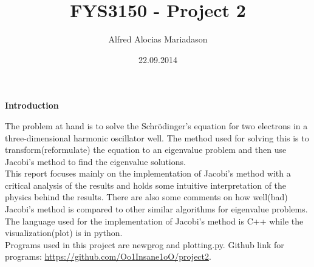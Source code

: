\documentclass[11pt, a4 paper]{report}
\title{FYS3150 - Project 2}
\author{Alfred Alocias Mariadason}
\date{22.09.2014}
\newenvironment{tabbed}{\begin{addmargin}{0.1cm}}{\end{addmargin}}
\newcommand{\sectiontitle}[1]{\begin{center} \Large\textbf{{#1}} \end{center}}
\newcommand{\vsp}{\vspace{0.2cm}}
\begin{document}
\maketitle

\sectiontitle{Introduction}
    \begin{tabbed}
        The problem at hand is to solve the Schrödinger’s equation for two electrons in a three-dimensional harmonic oscillator well. The method used for solving this is to transform(reformulate) the equation to an eigenvalue problem and then use Jacobi's method to find the eigenvalue solutions.\vsp\\
        This report focuses mainly on the implementation of Jacobi's method with a critical analysis of the results and holds some intuitive interpretation of the physics behind the results. There are also some comments on how well(bad) Jacobi's method is compared to other similar algorithms for eigenvalue problems.\vsp\\
        The language used for the implementation of Jacobi's method is C++ while the visualization(plot) is in python.\\
        Programs used in this project are new\underline prog and plotting.py. Github link for programs: \url{https://github.com/Oo1Insane1oO/project2}.
    \end{tabbed}
\end{document}
